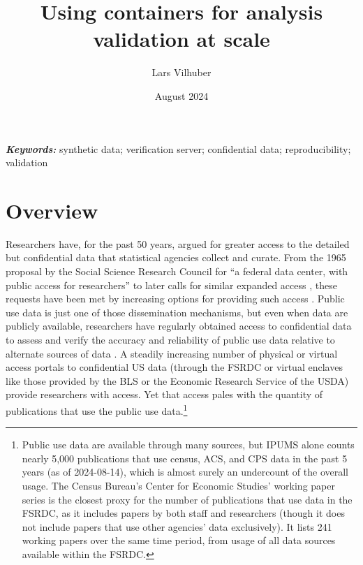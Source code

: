 \documentclass[12pt]{article}
\title{Using containers for analysis validation at scale}
\author{Lars Vilhuber}
\date{August 2024}
\begin{document}
\maketitle

%

\vspace*{0.15in}
\hspace{10pt}
  \small	
  \textbf{\textit{Keywords: }} {synthetic data; verification server; confidential data; reproducibility; validation}

\section{Overview}
\label{sec:overview}

Researchers have, for the past 50 years, argued for greater access to the detailed but confidential data that statistical agencies collect and curate. From the 1965 proposal by the Social Science Research
Council for ``a federal data center, with public access for researchers'' \citep[pg. 219]{anderson_american_2015} to later calls for similar expanded access \citep[e.g.][]{card_expanding_2010}, these requests have been met by increasing options for providing such access \citep{united_nations_managing_2007,schouten_remote_2003,weinberg_access_2007,cole_handbook_2021}. Public use data is just one of those dissemination mechanisms, but even when data are publicly available, researchers have regularly obtained access to confidential data to assess and verify the accuracy and reliability of public use data relative to alternate sources of data \citep[to cite just a few, ][]{larrimore_consistent_2008,armour_using_2016,alexander_inaccurate_2010,abraham_exploring_2013,abraham_reconciling_2020}. A steadily increasing number of physical or virtual access portals to confidential US data (through the \ac{FSRDC} or virtual enclaves like those provided by the \ac{BLS} or the Economic Research Service of the USDA) provide researchers with access. Yet that access pales with the quantity of publications that use the public use data.\footnote{Public use data are available through many sources, but \ac{IPUMS} alone counts nearly 5,000 publications that use census, \ac{ACS}, and \ac{CPS} data in the past 5 years (as of 2024-08-14), which is almost surely an undercount of the overall usage. The Census Bureau's Center for Economic Studies' working paper series is the closest proxy for the number of publications that use data in the \ac{FSRDC}, as it includes papers by both staff and researchers (though it does not include papers that use other agencies' data exclusively). It lists 241 working papers over the same time period, from usage of all data sources available within the \ac{FSRDC}.} 
\end{document}
